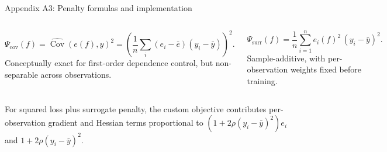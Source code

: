 \documentclass[aspectratio=169,10pt]{beamer}
\newcommand{\Cov}{\operatorname{Cov}}
\begin{document}
\begin{frame}{Appendix A3: Penalty formulas and implementation}
\footnotesize
\begin{columns}[T,onlytextwidth]
\begin{tcolorbox}[colback=Panel,colframe=LineGray,title=Direct squared covariance,arc=1.5mm]
\[
\Psi_{\mathrm{cov}}(f)
=\widehat{\Cov}(e(f),y)^2
=\left(\frac{1}{n}\sum_i(e_i-\bar e)(y_i-\bar y)\right)^2.
\]
Conceptually exact for first-order dependence control, but non-separable across observations.
\end{tcolorbox}

\begin{tcolorbox}[colback=MethodBlue!6,colframe=MethodBlue!65,title=Separable surrogate,arc=1.5mm]
\[
\Psi_{\mathrm{surr}}(f)
=\frac{1}{n}\sum_{i=1}^n e_i(f)^2\,(y_i-\bar y)^2.
\]
Sample-additive, with per-observation weights fixed before training.
\end{tcolorbox}
\end{columns}

\vspace{3mm}
\begin{tcolorbox}[colback=Good!6,colframe=Good!60,arc=1.5mm]
\centering
For squared loss plus surrogate penalty, the custom objective contributes per-observation gradient and Hessian terms proportional to $(1+2\rho(y_i-\bar y)^2)e_i$ and $1+2\rho(y_i-\bar y)^2$.
\end{tcolorbox}
\end{frame}
\end{document}
